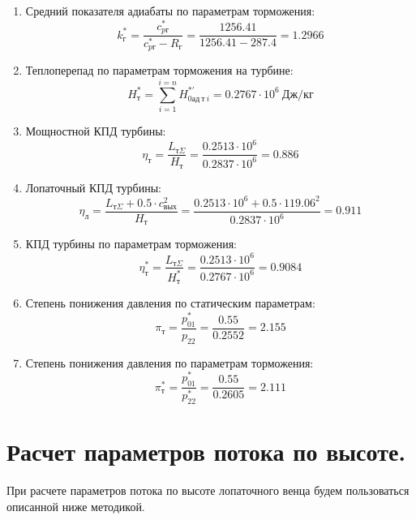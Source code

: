 \documentclass[a4paper,10pt]{article}
\begin{document}
\begin{enumerate}
        \item Средний показателя адиабаты по параметрам торможения:
        \[
            k_г^* = \frac{ c_{pг}^* }{ c_{pг}^* - R_г } =
                \frac{
                    1256.41
                }{
                    1256.41 - 287.4
                }
            = 1.2966
        \]

        \item Теплоперепад по параметрам торможения на турбине:
        \[
            H_т^* = \sum_{i=1}^{i=n}H_{0ад\ т\ i}^{*\prime} =
            0.2767 \cdot 10^6 \ Дж/кг
        \]

        \item Мощностной КПД турбины:
        \[
            \eta_т = \frac{ L_{т\Sigma} }{ H_т } =
                \frac{ 0.2513 \cdot 10^6 }{ 0.2837 \cdot 10^6 } =
            0.886
        \]

        \item Лопаточный КПД турбины:
        \[
            \eta_л = \frac{
                        L_{т\Sigma} + 0.5 \cdot c_{вых}^2
                    }{ H_т } =
            \frac{
                0.2513 \cdot 10^6 + 0.5 \cdot 119.06 ^ 2
            }{ 0.2837 \cdot 10^6 } =
            0.911
        \]

        \item КПД турбины по параметрам торможения:
        \[
            \eta_т^* = \frac{ L_{т\Sigma} }{ H_т^* } =
                \frac{ 0.2513 \cdot 10^6 }{ 0.2767 \cdot 10^6 } =
            0.9084
        \]

        \item Степень понижения давления по статическим параметрам:
        \[
            \pi_{т} = \frac{p_{01}^*}{p_{2 2}} =
            \frac{0.55}{0.2552} =
            2.155
        \]

        \item Степень понижения давления по параметрам торможения:
        \[
            \pi_{т}^* = \frac{p_{01}^*}{p_{2 2}^*} =
            \frac{0.55}{0.2605} =
            2.111
        \]

    \end{enumerate}
    

    \section{Расчет параметров потока по высоте.}

    

    При расчете параметров потока по высоте лопаточного венца будем пользоваться описанной ниже методикой.
\end{document}
